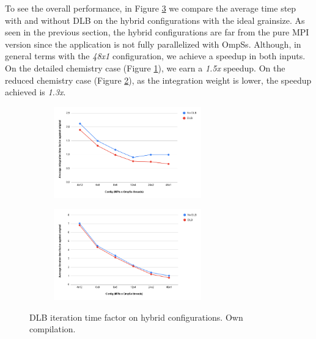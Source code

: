 To see the overall performance, in Figure \ref{fig:plot-hybrid-dlb-it} we compare the average time step with and without DLB on the hybrid configurations with the ideal grainsize. As seen in the previous section, the hybrid configurations are far from the pure MPI version since the application is not fully parallelized with OmpSs. Although, in general terms with the \textit{48x1} configuration, we achieve a speedup in both inputs. On the detailed chemistry case (Figure \ref{fig:plot-hybrid-dlb-it-det}), we earn a \textit{1.5x} speedup. On the reduced chemistry case (Figure \ref{fig:plot-hybrid-dlb-it-red}), as the integration weight is lower, the speedup achieved is \textit{1.3x}.

\begin{figure}[ht]
  \begin{subfigure}{1\textwidth}
    \centering
    \includegraphics[width=0.7\textwidth]{graphics/hybridcompletedlbabs.png}
    \label{fig:plot-hybrid-dlb-it-det}

  \end{subfigure}
  \begin{subfigure}{1\textwidth}
    \centering
    \includegraphics[width=0.7\textwidth]{graphics/hybridreduceddlbabs.png}
    \label{fig:plot-hybrid-dlb-it-red}

  \end{subfigure}

  \caption[DLB iteraiton time factor on hybrid configurations.]{DLB iteration time factor on hybrid configurations. Own compilation.}
  \label{fig:plot-hybrid-dlb-it}
\end{figure}

